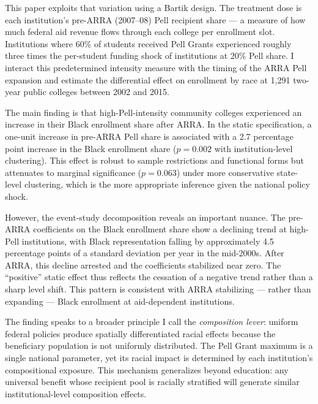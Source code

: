 \documentclass[12pt]{article}
\begin{document}
This paper exploits that variation using a Bartik design. The treatment dose is each institution's pre-ARRA (2007--08) Pell recipient share --- a measure of how much federal aid revenue flows through each college per enrollment slot. Institutions where 60\% of students received Pell Grants experienced roughly three times the per-student funding shock of institutions at 20\% Pell share. I interact this predetermined intensity measure with the timing of the ARRA Pell expansion and estimate the differential effect on enrollment by race at 1,291 two-year public colleges between 2002 and 2015.

The main finding is that high-Pell-intensity community colleges experienced an increase in their Black enrollment share after ARRA. In the static specification, a one-unit increase in pre-ARRA Pell share is associated with a 2.7 percentage point increase in the Black enrollment share ($p = 0.002$ with institution-level clustering). This effect is robust to sample restrictions and functional forms but attenuates to marginal significance ($p = 0.063$) under more conservative state-level clustering, which is the more appropriate inference given the national policy shock.

However, the event-study decomposition reveals an important nuance. The pre-ARRA coefficients on the Black enrollment share show a declining trend at high-Pell institutions, with Black representation falling by approximately 4.5 percentage points of a standard deviation per year in the mid-2000s. After ARRA, this decline arrested and the coefficients stabilized near zero. The ``positive'' static effect thus reflects the cessation of a negative trend rather than a sharp level shift. This pattern is consistent with ARRA stabilizing --- rather than expanding --- Black enrollment at aid-dependent institutions.

The finding speaks to a broader principle I call the \textit{composition lever}: uniform federal policies produce spatially differentiated racial effects because the beneficiary population is not uniformly distributed. The Pell Grant maximum is a single national parameter, yet its racial impact is determined by each institution's compositional exposure. This mechanism generalizes beyond education: any universal benefit whose recipient pool is racially stratified will generate similar institutional-level composition effects.
\end{document}
